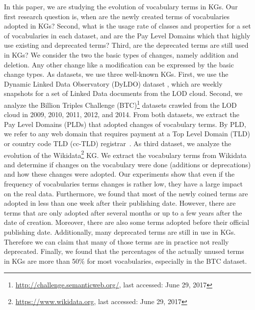 In this paper, we are studying the evolution of vocabulary terms in KGs. Our first research question is, when are the newly created terms of vocabularies adopted in KGs? Second, what is the usage rate of classes and properties for a set of vocabularies in each dataset, and are the Pay Level Domains which that highly use existing and deprecated terms? Third, are the deprecated terms are still used in KGs?
%
We consider the two the basic types of changes, namely addition and deletion. Any other change like a modification can be expressed by the basic change types.
%
As datasets, we use three well-known KGs. 
First, we use the Dynamic Linked Data Observatory (DyLDO) dataset \cite{kafer2012towards}, which are weekly snapshots for a set of Linked Data documents from the LOD cloud.
Second, we analyze the Billion Triples Challenge (BTC)\footnote{\url{http://challenge.semanticweb.org/}, last accessed: June 29, 2017} datasets crawled from the LOD cloud in 2009, 2010, 2011, 2012, and 2014. 
From both datasets, we extract the Pay Level Domains (PLDs) that adopted changes of vocabulary terms. 
By PLD, we refer to any web domain that requires payment at a Top Level Domain (TLD) or country code TLD (cc-TLD) registrar~\cite{lee2009irlbot}. 
%
As third dataset, we analyze the evolution of the Wikidata\footnote{\url{https://www.wikidata.org}, last accessed: June 29, 2017} KG. 
We extract the vocabulary terms from Wikidata and determine if changes on the vocabulary were done (additions or deprecations) and how these changes were adopted. 
%
%
Our experiments show that even if the frequency of vocabularies terms changes is rather low, they have a large impact on the real data. Furthermore, we found that most of the newly coined terms are adopted in less than one week after their publishing date. However, there are terms that are only adopted after several months or up to a few years after the date of creation. Moreover, there are also some terms adopted before their official publishing date.
Additionally, many deprecated terms are still in use in KGs. Therefore we can claim that many of those terms are in practice not really deprecated. Finally, we found that the percentages of the actually unused terms in KGs are more than 50\% for most vocabularies, especially in the BTC dataset.
